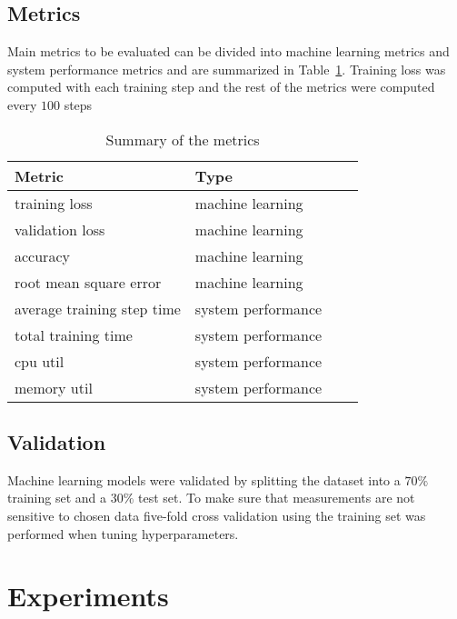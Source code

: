 \subsection{Metrics}
Main metrics to be evaluated can be divided into machine learning metrics and system performance metrics and are summarized in Table~\ref{table:metrics}. Training loss was computed with each training step and the rest of the metrics were computed every $100$ steps
\begin{table}[h]
    \centering
    \begin{tabular}{llll}
        \toprule
        Metric                     & Type               \\
        \midrule
        training loss              & machine learning   \\
        validation loss            & machine learning   \\
        accuracy                   & machine learning   \\
        root mean square error     & machine learning   \\
        average training step time & system performance \\
        total training time        & system performance \\
        cpu util                   & system performance \\
        memory util                & system performance \\

        \bottomrule
    \end{tabular}
    \caption{Summary of the metrics}
    \label{table:metrics}
\end{table}


\subsection{Validation}

Machine learning models were validated by splitting the dataset into a $70\%$ training set and a $30\%$ test set. To make sure that measurements are not sensitive to chosen data five-fold cross validation using the training set was performed when tuning hyperparameters.

\section{Experiments}
\label{sec:experiments}

